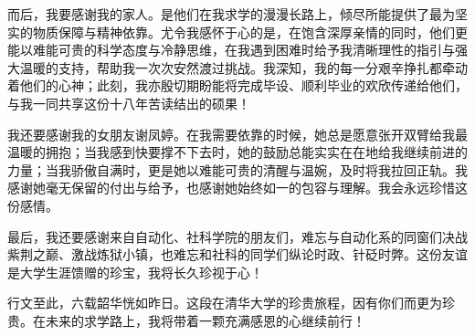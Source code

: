 \begin{acknowledgements}
而后，我要感谢我的家人。是他们在我求学的漫漫长路上，倾尽所能提供了最为坚实的物质保障与精神依靠。尤令我感怀于心的是，在饱含深厚亲情的同时，他们更能以难能可贵的科学态度与冷静思维，在我遇到困难时给予我清晰理性的指引与强大温暖的支持，帮助我一次次安然渡过挑战。我深知，我的每一分艰辛挣扎都牵动着他们的心神；此刻，我亦殷切期盼能将完成毕设、顺利毕业的欢欣传递给他们，与我一同共享这份十八年苦读结出的硕果！​

我还要感谢我的女朋友谢凤婷。在我需要依靠的时候，她总是愿意张开双臂给我最温暖的拥抱；当我感到快要撑不下去时，她的鼓励总能实实在在地给我继续前进的力量；当我骄傲自满时，更是她以难能可贵的清醒与温婉，及时将我拉回正轨。我感谢她毫无保留的付出与给予，也感谢她始终如一的包容与理解。我会永远珍惜这份感情。

最后，我还要感谢来自自动化、社科学院的朋友们，难忘与自动化系的同窗们决战紫荆之巅、激战炼狱小镇，也难忘和社科的同学们纵论时政、针砭时弊。这份友谊是大学生涯馈赠的珍宝，我将长久珍视于心！

行文至此，六载韶华恍如昨日。这段在清华大学的珍贵旅程，因有你们而更为珍贵。在未来的求学路上，我将带着一颗充满感恩的心继续前行！

\end{acknowledgements}
